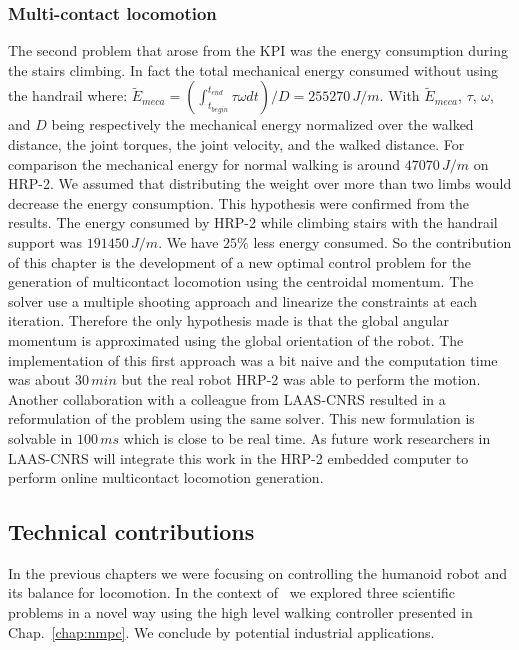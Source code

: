 \subsubsection*{Multi-contact locomotion}

The second problem that arose from the KPI was the energy consumption during the stairs climbing.
In fact the total mechanical energy consumed without using the handrail where:
$ \tilde{E}_{meca} = \left(\int_{t_{begin}}^{t_{end}} \tau \omega dt \right) / D = 255270\,
J/m$.
With $ \tilde{E}_{meca}$, $\tau$, $\omega$, and $D$ being respectively the mechanical energy normalized over the walked distance, the joint torques, the joint velocity, and the walked distance.
For comparison the mechanical energy for normal walking is around $47070\,J/m$ on HRP-2.
We assumed that distributing the weight over more than two limbs would decrease the energy consumption.
This hypothesis were confirmed from the results.
The energy consumed by HRP-2 while climbing stairs with the handrail support was $191450
\,J/m$.
We have $25\%$ less energy consumed.
So the contribution of this chapter is the development of a new optimal control problem for the generation of multicontact locomotion using the centroidal momentum.
The solver use a multiple shooting approach and linearize the constraints at each iteration.
Therefore the only hypothesis made is that the global angular momentum is approximated using the global orientation of the robot.
The implementation of this first approach was a bit naive and the computation time was about $30\,min$ but the real robot HRP-2 was able to perform the motion.
Another collaboration with a colleague from LAAS-CNRS resulted in a reformulation of the problem using the same solver.
This new formulation is solvable in $100\,ms$ which is close to be real time.
As future work researchers in LAAS-CNRS will integrate this work in the HRP-2 embedded computer to perform online multicontact locomotion generation.

\subsection*{Technical contributions}

In the previous chapters we were focusing on controlling the humanoid robot and its balance for locomotion.
In the context of \koroibot\ we explored three scientific problems in a novel way using the high level walking controller presented in Chap.~\ref{chap:nmpc}.
We conclude by potential industrial applications.


